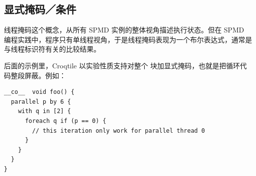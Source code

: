 \subsection*{显式掩码／条件}

线程掩码这个概念，从所有 SPMD 实例的整体视角描述执行状态。但在 SPMD 编程实践中，程序只有单线程视角，于是线程掩码表现为一个布尔表达式，通常是与线程标识符有关的比较结果。

后面的示例里，Croqtile 以实验性质支持对整个 \co@foreach@ 块加显式掩码，也就是把循环代码整段屏蔽。例如：

\begin{lstlisting}[language=croqtile,caption={显式掩码／条件}]
__co__  void foo() {
  parallel p by 6 {
    with q in [2] {
      foreach q if (p == 0) {
        // this iteration only work for parallel thread 0
      }
    }
  }
}
\end{lstlisting}
